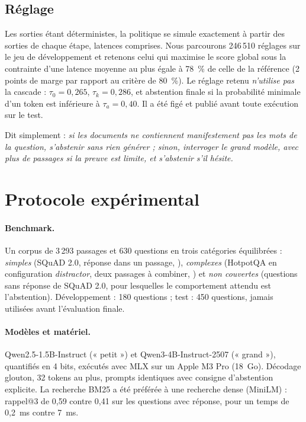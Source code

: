 \documentclass[11pt,a4paper]{article}
\begin{document}
\subsection{Réglage}

Les sorties étant déterministes, la politique se simule exactement à partir des sorties de chaque étape,
latences comprises. Nous parcourons 246\,510 réglages sur le jeu de développement et retenons celui qui
maximise le score global sous la contrainte d'une latence moyenne au plus égale à 78~\% de celle de la
référence (2 points de marge par rapport au critère de 80~\%). Le réglage retenu \emph{n'utilise pas} la
cascade : $\tau_0 = 0{,}265$, $\tau_k = 0{,}286$, et abstention finale si la probabilité minimale d'un
token est inférieure à $\tau_a = 0{,}40$. Il a été figé et publié avant toute exécution sur le test.

Dit simplement : \emph{si les documents ne contiennent manifestement pas les mots de la question,
s'abstenir sans rien générer ; sinon, interroger le grand modèle, avec plus de passages si la preuve est
limite, et s'abstenir s'il hésite.}

\section{Protocole expérimental}\label{sec:protocole}

\paragraph{Benchmark.} Un corpus de 3\,293 passages et 630 questions en trois catégories équilibrées :
\emph{simples} (SQuAD 2.0, réponse dans un passage, \citealp{rajpurkar2018squad2}), \emph{complexes}
(HotpotQA en configuration \emph{distractor}, deux passages à combiner, \citealp{yang2018hotpotqa}) et
\emph{non couvertes} (questions sans réponse de SQuAD 2.0, pour lesquelles le comportement attendu est
l'abstention). Développement : 180 questions ; test : 450 questions, jamais utilisées avant l'évaluation
finale.

\paragraph{Modèles et matériel.} Qwen2.5-1.5B-Instruct (« petit ») et Qwen3-4B-Instruct-2507
(« grand »), quantifiés en 4 bits, exécutés avec MLX sur un Apple M3 Pro (18~Go). Décodage glouton,
32 tokens au plus, prompts identiques avec consigne d'abstention explicite. La recherche BM25 a été
préférée à une recherche dense (MiniLM) : rappel@3 de 0,59 contre 0,41 sur les questions avec réponse,
pour un temps de 0,2~ms contre 7~ms.
\end{document}
